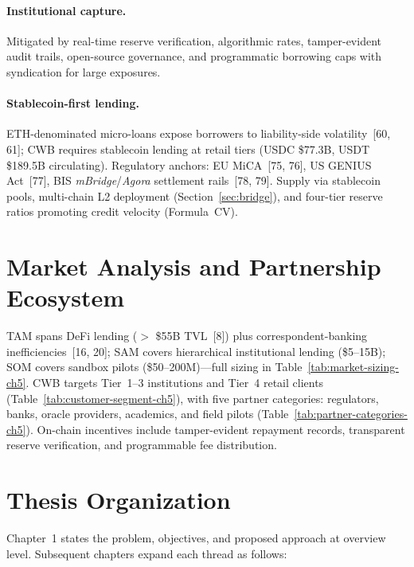 \documentclass[12pt, a4paper]{report}
\begin{document}
\paragraph{Institutional capture.} Mitigated by real-time reserve verification, algorithmic rates, tamper-evident audit trails, open-source governance, and programmatic borrowing caps with syndication for large exposures.

\paragraph{Stablecoin-first lending.}
\label{sec:stablecoin-first}
ETH-denominated micro-loans expose borrowers to liability-side volatility~[60, 61]; CWB requires stablecoin lending at retail tiers (USDC \$77.3B, USDT \$189.5B circulating). Regulatory anchors: EU MiCA~[75, 76], US GENIUS Act~[77], BIS \textit{mBridge}/\textit{Agora} settlement rails~[78, 79]. Supply via stablecoin pools, multi-chain L2 deployment (Section~\ref{sec:bridge}), and four-tier reserve ratios promoting credit velocity (Formula~CV).

\section{Market Analysis and Partnership Ecosystem}

TAM spans DeFi lending ($>$ \$55B TVL~[8]) plus correspondent-banking inefficiencies~[16, 20]; SAM covers hierarchical institutional lending (\$5--15B); SOM covers sandbox pilots (\$50--200M)---full sizing in Table~\ref{tab:market-sizing-ch5}. CWB targets Tier~1--3 institutions and Tier~4 retail clients (Table~\ref{tab:customer-segment-ch5}), with five partner categories: regulators, banks, oracle providers, academics, and field pilots (Table~\ref{tab:partner-categories-ch5}). On-chain incentives include tamper-evident repayment records, transparent reserve verification, and programmable fee distribution.

\section{Thesis Organization}
\label{sec:thesis-organization}

Chapter~1 states the problem, objectives, and proposed approach at overview level. Subsequent chapters expand each thread as follows:
\end{document}
